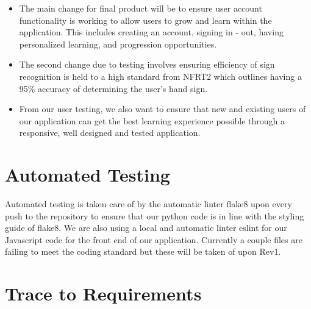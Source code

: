 \documentclass[12pt, titlepage]{article}
\begin{document}
\begin{itemize}
    \item The main change for final product will be to ensure user account functionality is working to allow users to grow and learn within the application. This includes creating an account, signing in - out, having personalized learning, and progression opportunities.

    \item The second change due to testing involves ensuring efficiency of sign recognition is held to a high standard from NFRT2 which outlines having a 95\% accuracy of determining the user's hand sign.

    \item From our user testing, we also want to ensure that new and existing users of our application can get the best learning experience possible through a responsive, well designed and tested application.
\end{itemize}

\section{Automated Testing}

Automated testing is taken care of by the automatic linter flake8 upon every push to the repository to ensure that our python code is in line with the styling guide of flake8. We are also using a local and automatic linter eslint for our Javascript code for the front end of our application. Currently a couple files are failing to meet the coding standard but these will be taken of upon Rev1.

\section{Trace to Requirements}
\end{document}
